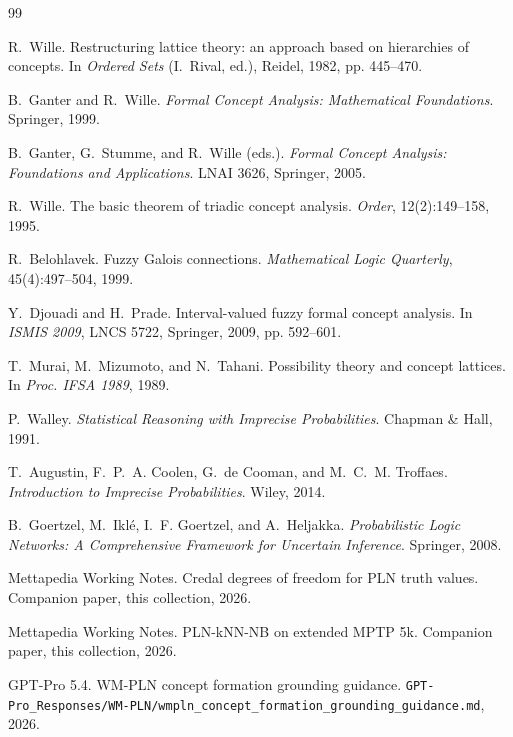 \documentclass[]{article}
\newcommand{\lpath}[1]{\texttt{\nolinkurl{#1}}}
\begin{document}
\begin{thebibliography}{99}

R.~Wille.
\newblock Restructuring lattice theory: an approach based on hierarchies of concepts.
\newblock In \emph{Ordered Sets} (I.~Rival, ed.), Reidel, 1982, pp. 445--470.

B.~Ganter and R.~Wille.
\newblock \emph{Formal Concept Analysis: Mathematical Foundations}.
\newblock Springer, 1999.

B.~Ganter, G.~Stumme, and R.~Wille (eds.).
\newblock \emph{Formal Concept Analysis: Foundations and Applications}.
\newblock LNAI 3626, Springer, 2005.

R.~Wille.
\newblock The basic theorem of triadic concept analysis.
\newblock \emph{Order}, 12(2):149--158, 1995.

R.~Belohlavek.
\newblock Fuzzy Galois connections.
\newblock \emph{Mathematical Logic Quarterly}, 45(4):497--504, 1999.

Y.~Djouadi and H.~Prade.
\newblock Interval-valued fuzzy formal concept analysis.
\newblock In \emph{ISMIS 2009}, LNCS 5722, Springer, 2009, pp. 592--601.

T.~Murai, M.~Mizumoto, and N.~Tahani.
\newblock Possibility theory and concept lattices.
\newblock In \emph{Proc. IFSA 1989}, 1989.

P.~Walley.
\newblock \emph{Statistical Reasoning with Imprecise Probabilities}.
\newblock Chapman \& Hall, 1991.

T.~Augustin, F.~P.~A. Coolen, G.~de Cooman, and M.~C.~M. Troffaes.
\newblock \emph{Introduction to Imprecise Probabilities}.
\newblock Wiley, 2014.

B.~Goertzel, M.~Iklé, I.~F. Goertzel, and A.~Heljakka.
\newblock \emph{Probabilistic Logic Networks: A Comprehensive Framework for
Uncertain Inference}.
\newblock Springer, 2008.

Mettapedia Working Notes.
\newblock Credal degrees of freedom for PLN truth values.
\newblock Companion paper, this collection, 2026.

Mettapedia Working Notes.
\newblock PLN-kNN-NB on extended MPTP 5k.
\newblock Companion paper, this collection, 2026.

GPT-Pro 5.4.
\newblock WM-PLN concept formation grounding guidance.
\newblock \lpath{GPT-Pro\_Responses/WM-PLN/wmpln\_concept\_formation\_grounding\_guidance.md},
2026.


\end{thebibliography}
\end{document}
